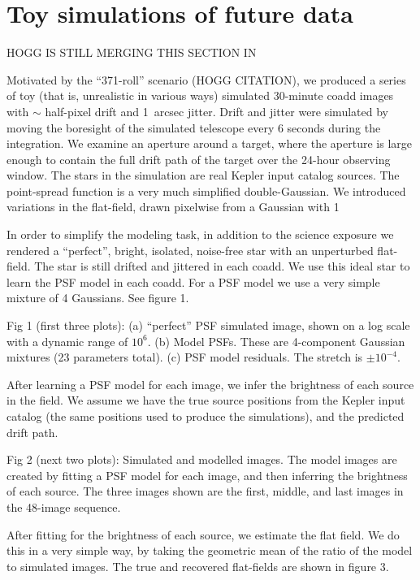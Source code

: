 \documentclass[letterpaper,12pt,preprint]{aastex}
\begin{document}
\section{Toy simulations of future data}\label{sec:future}

HOGG IS STILL MERGING THIS SECTION IN

Motivated by the ``371-roll'' scenario (HOGG CITATION),
  we produced a series of toy (that is, unrealistic in various ways)
  simulated 30-minute coadd images with $\sim$ half-pixel drift and 1~arcsec jitter.
Drift and jitter were simulated by moving the boresight of the simulated telescope every 6 seconds during the integration.  We examine an aperture around a target, where the aperture is large enough to contain the full drift path of the target over the 24-hour observing window.  The stars in the simulation are real Kepler input catalog sources.  The point-spread function is a very much simplified double-Gaussian.  We introduced variations in the flat-field, drawn pixelwise from a Gaussian with 1%

In order to simplify the modeling task, in addition to the science exposure we rendered a ``perfect'', bright, isolated, noise-free star with an unperturbed flat-field.  The star is still drifted and jittered in each coadd.  We use this ideal star to learn the PSF model in each coadd.  For a PSF model we use a very simple mixture of 4 Gaussians.  See figure 1.

Fig 1 (first three plots): (a) ``perfect'' PSF simulated image, shown on a log scale with a dynamic range of $10^6$. (b) Model PSFs.  These are 4-component Gaussian mixtures (23 parameters total).  (c) PSF model residuals.  The stretch is $\pm 10^{-4}$.

After learning a PSF model for each image, we infer the brightness of each source in the field.  We assume we have the true source positions from the Kepler input catalog (the same positions used to produce the simulations), and the predicted drift path.

Fig 2 (next two plots): Simulated and modelled images.  The model images are created by fitting a PSF model for each image, and then inferring the brightness of each source.  The three images shown are the first, middle, and last images in the 48-image sequence.

After fitting for the brightness of each source, we estimate the flat field.  We do this in a very simple way, by taking the geometric mean of the ratio of the model to simulated images.  The true and recovered flat-fields are shown in figure 3.
\end{document}
